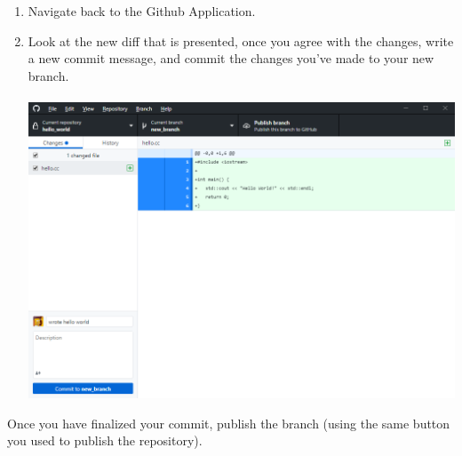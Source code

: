 \documentclass[12pt, letter]{article}
\begin{document}
    \begin{enumerate}
        \item Navigate back to the Github Application.

        \item Look at the new diff that is presented, once you agree with the changes, write a new commit message, and commit the changes you've made to your new branch. \\ \\ %
        \includegraphics{screenshots/shot8.bmp}
    \end{enumerate}
    Once you have finalized your commit, publish the branch (using the same button you used to publish the repository).
\end{document}
